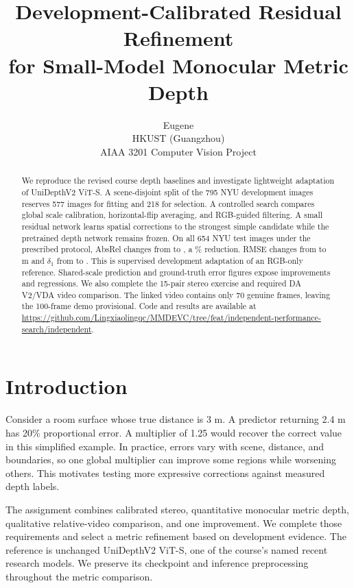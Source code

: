 \documentclass[10pt,twocolumn,letterpaper]{article}
\title{Development-Calibrated Residual Refinement\\for Small-Model Monocular Metric Depth}
\author{Eugene\\HKUST (Guangzhou)\\AIAA 3201 Computer Vision Project}
\begin{document}
\maketitle
\begin{abstract}
We reproduce the revised course depth baselines and investigate lightweight adaptation of UniDepthV2 ViT-S. A scene-disjoint split of the 795 NYU development images reserves 577 images for fitting and 218 for selection. A controlled search compares global scale calibration, horizontal-flip averaging, and RGB-guided filtering. A small residual network learns spatial corrections to the strongest simple candidate while the pretrained depth network remains frozen. On all 654 NYU test images under the prescribed protocol, AbsRel changes from \MetricBaseAbs{} to \MetricFinalAbs{}, a \MetricGain\% reduction. RMSE changes from \MetricBaseRMSE{} to \MetricFinalRMSE{} m and $\delta_1$ from \MetricBaseDelta{} to \MetricFinalDelta{}. This is supervised development adaptation of an RGB-only reference. Shared-scale prediction and ground-truth error figures expose improvements and regressions. We also complete the 15-pair stereo exercise and required DA V2/VDA video comparison. The linked video contains only 70 genuine frames, leaving the 100-frame demo provisional. Code and results are available at \url{https://github.com/Lingxiaolingqc/MMDEVC/tree/feat/independent-performance-search/independent}.
\end{abstract}

\section{Introduction}
Consider a room surface whose true distance is 3 m. A predictor returning 2.4 m has 20\% proportional error. A multiplier of 1.25 would recover the correct value in this simplified example. In practice, errors vary with scene, distance, and boundaries, so one global multiplier can improve some regions while worsening others. This motivates testing more expressive corrections against measured depth labels.

The assignment combines calibrated stereo, quantitative monocular metric depth, qualitative relative-video comparison, and one improvement. We complete those requirements and select a metric refinement based on development evidence. The reference is unchanged UniDepthV2 ViT-S, one of the course's named recent research models. We preserve its checkpoint and inference preprocessing throughout the metric comparison.
\end{document}
